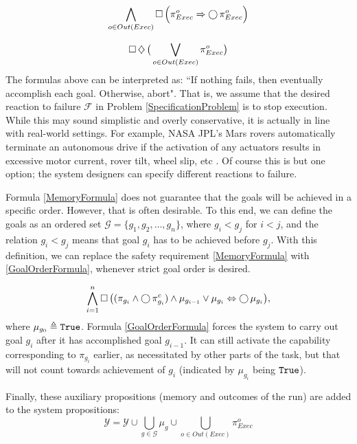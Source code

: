 \begin{equation}\label{SMOutcomePersistenceFormula}
	\bigwedge \limits_{o \in Out(Exec)} \operatorname{\Box} \Big( \pi_{Exec}^{o} \Rightarrow \operatorname{\bigcirc} \pi_{Exec}^{o} \Big)
\end{equation}

\begin{equation}\label{SuccessLivenessFormula}
	\operatorname{\Box} \operatorname{\diamondsuit} \big( \bigvee \limits_{o \in Out(Exec)} \pi_{Exec}^{o} \big)
\end{equation}
The formulas above can be interpreted as: ``If nothing fails, then eventually accomplish each goal. Otherwise, abort".
That is, we assume that the desired reaction to failure $\mathcal{F}$ in Problem \ref{SpecificationProblem} is to stop execution.
While this may sound simplistic and overly conservative, it is actually in line with real-world settings.
For example, NASA JPL's Mars rovers automatically terminate an autonomous drive if the activation of any actuators results in excessive motor current, rover tilt, wheel slip, etc \cite{MER2006Aero}.
Of course this is but one option; the system designers can specify different reactions to failure.

Formula \eqref{MemoryFormula} does not guarantee that the goals will be achieved in a specific order.
However, that is often desirable.
To this end, we can define the goals as an ordered set $\mathcal{G} = \{ g_1, g_2, \ldots, g_n \}$, where $g_i < g_j$ for $i<j$, and the relation $g_i < g_j$ means that goal $g_i$ has to be achieved before $g_j$.
With this definition, we can replace the safety requirement \eqref{MemoryFormula} with \eqref{GoalOrderFormula}, whenever strict goal order is desired.

\begin{equation}\label{GoalOrderFormula}
	\bigwedge \limits_{i = 1}^n \operatorname{\Box} \big( (\pi_{g_i} \wedge \operatorname{\bigcirc} \pi_{g_i}^c) \wedge \mu_{g_{i-1}} \vee \mu_{g_i} \Leftrightarrow \operatorname{\bigcirc} \mu_{g_i} \big),
\end{equation}
where $\mu_{g_0} \triangleq \mathtt{True}$.
Formula \eqref{GoalOrderFormula} forces the system to carry out goal $g_i$ after it has accomplished goal $g_{i-1}$.
It can still activate the capability corresponding to $\pi_{g_i}$ earlier, as necessitated by other parts of the task, but that will not count towards achievement of $g_i$ (indicated by $\mu_{g_i}$ being $\mathtt{True}$).

Finally, these auxiliary propositions (memory and outcomes of the run) are added to the system propositions: $$\mathcal{Y} = \mathcal{Y} \cup \bigcup \limits_{g \in \mathcal{G}} \mu_g \cup \bigcup \limits_{o \in Out(Exec)} \pi_{Exec}^o$$

